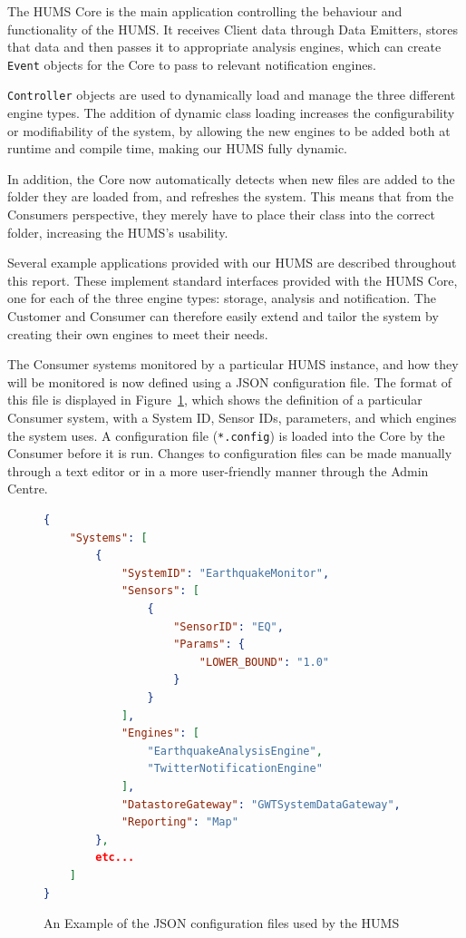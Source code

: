 \documentclass[10pt,a4paper]{article}
\begin{document}
The HUMS Core is the main application controlling the behaviour and functionality of the HUMS. It receives Client data through Data Emitters, stores that data and then passes it to appropriate analysis engines, which can create \texttt{Event} objects for the Core to pass to relevant notification engines.

\texttt{Controller} objects are used to dynamically load and manage the three different engine types. The addition of dynamic class loading increases the configurability or modifiability of the system, by allowing the new engines to be added both at runtime and compile time, making our HUMS fully dynamic. 

In addition, the Core now automatically detects when new files are added to the folder they are loaded from, and refreshes the system. This means that from the Consumers perspective, they merely have to place their class into the correct folder, increasing the HUMS's usability. 

Several example applications provided with our HUMS are described throughout this report. These implement standard interfaces provided with the HUMS Core, one for each of the three engine types: storage, analysis and notification. The Customer and Consumer can therefore easily extend and tailor the system by creating their own engines to meet their needs.

The Consumer systems monitored by a particular HUMS instance, and how they will be monitored is now defined using a JSON configuration file. The format of this file is displayed in Figure~\ref{fig:configFiles}, which shows the definition of a particular Consumer system, with a System ID, Sensor IDs, parameters, and which engines the system uses. A configuration file (\texttt{*.config}) is loaded into the Core by the Consumer before it is run. Changes to configuration files can be made manually through a text editor or in a more user-friendly manner through the Admin Centre.

\begin{figure}[tbp]
\begin{lstlisting}[language=json,firstnumber=1]
{
    "Systems": [
        {
            "SystemID": "EarthquakeMonitor",
            "Sensors": [
                {
                    "SensorID": "EQ",
                    "Params": {
                        "LOWER_BOUND": "1.0"
                    }
                }
            ],
            "Engines": [
                "EarthquakeAnalysisEngine",
                "TwitterNotificationEngine"
            ],
            "DatastoreGateway": "GWTSystemDataGateway",
            "Reporting": "Map"
        },
        etc...
    ]
}
\end{lstlisting}
\caption{An Example of the JSON configuration files used by the HUMS}
\label{fig:configFiles}
\end{figure}
\end{document}
